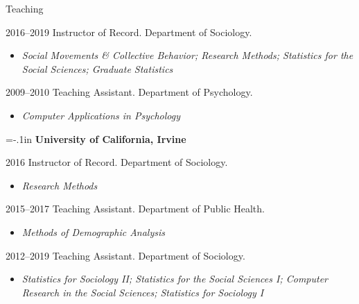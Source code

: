 \begin{rSection}{Teaching}
\begin{hangt}{2016--2019}
Instructor of Record. Department of Sociology. 
\vspace*{-.5em} 
\begin{itemize}[leftmargin=.25in] \vspace*{-.25em} 
\item {\footnotesize \it Social Movements \& Collective Behavior\textup{;} Research Methods\textup{;} Statistics for the Social Sciences\textup{;} Graduate Statistics}
\end{itemize}
\end{hangt}
\vspace*{-.5em} 
\begin{hangt}{2009--2010}
Teaching Assistant. Department of Psychology.
\vspace*{-.5em} 
\begin{itemize}[leftmargin=.25in] \vspace*{-.25em} 
\item {\footnotesize \it Computer Applications in Psychology}
\end{itemize}
\end{hangt}

{\parindent=-.1in {\bf University of California, Irvine}}

\vspace*{-.5em} 
\begin{hangt}{2016 \datefill}
Instructor of Record. Department of Sociology.
\vspace*{-.5em} 
\begin{itemize}[leftmargin=.25in] \vspace*{-.25em} 
\item {\footnotesize \it Research Methods}
\end{itemize}
\end{hangt}
\vspace*{-.5em} 
\begin{hangt}{2015--2017}
Teaching Assistant. Department of Public Health.
\vspace*{-.5em} 
\begin{itemize}[leftmargin=.25in] \vspace*{-.25em} 
\item {\footnotesize \it Methods of Demographic Analysis}
\end{itemize}
\end{hangt}
\vspace*{-.5em} 
\begin{hangt}{2012--2019}
Teaching Assistant. Department of Sociology.
\vspace*{-.5em} 
\begin{itemize}[leftmargin=.25in] \vspace*{-.25em} 
\item {\footnotesize \it Statistics for Sociology II\textup{;} Statistics for the Social Sciences I\textup{;} Computer Research in the Social Sciences\textup{;} Statistics for Sociology I}
\end{itemize}
\end{hangt}


\end{rSection}
